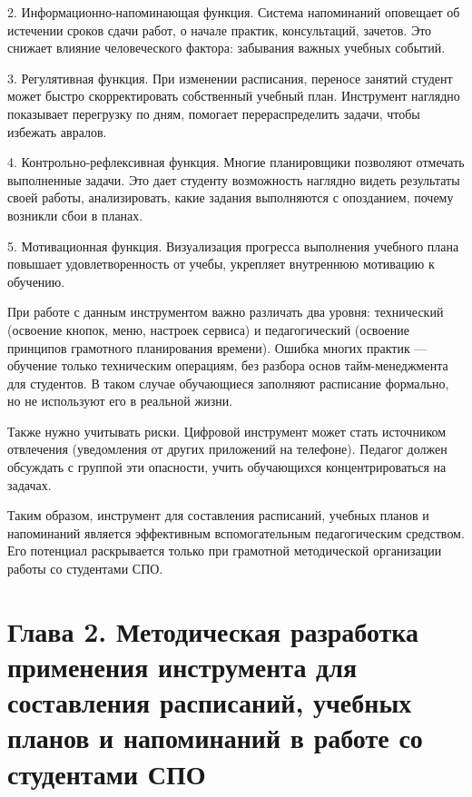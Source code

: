 \documentclass[
]{article}
\begin{document}
2. Информационно-напоминающая функция. Система напоминаний оповещает об
истечении сроков сдачи работ, о начале практик, консультаций, зачетов.
Это снижает влияние человеческого фактора: забывания важных учебных
событий.

3. Регулятивная функция. При изменении расписания, переносе занятий
студент может быстро скорректировать собственный учебный план.
Инструмент наглядно показывает перегрузку по дням, помогает
перераспределить задачи, чтобы избежать авралов.

4. Контрольно-рефлексивная функция. Многие планировщики позволяют
отмечать выполненные задачи. Это дает студенту возможность наглядно
видеть результаты своей работы, анализировать, какие задания выполняются
с опозданием, почему возникли сбои в планах.

5. Мотивационная функция. Визуализация прогресса выполнения учебного
плана повышает удовлетворенность от учебы, укрепляет внутреннюю
мотивацию к обучению.

При работе с данным инструментом важно различать два уровня: технический
(освоение кнопок, меню, настроек сервиса) и педагогический (освоение
принципов грамотного планирования времени). Ошибка многих практик ---
обучение только техническим операциям, без разбора основ
тайм-менеджмента для студентов. В таком случае обучающиеся заполняют
расписание формально, но не используют его в реальной жизни.

Также нужно учитывать риски. Цифровой инструмент может стать источником
отвлечения (уведомления от других приложений на телефоне). Педагог
должен обсуждать с группой эти опасности, учить обучающихся
концентрироваться на задачах.

Таким образом, инструмент для составления расписаний, учебных планов и
напоминаний является эффективным вспомогательным педагогическим
средством. Его потенциал раскрывается только при грамотной методической
организации работы со студентами СПО.

\section{\texorpdfstring{\textbf{Глава 2. Методическая разработка
применения инструмента для составления расписаний, учебных планов и
напоминаний в работе со студентами
СПО}}{Глава 2. Методическая разработка применения инструмента для составления расписаний, учебных планов и напоминаний в работе со студентами СПО}}\label{ux433ux43bux430ux432ux430-2.-ux43cux435ux442ux43eux434ux438ux447ux435ux441ux43aux430ux44f-ux440ux430ux437ux440ux430ux431ux43eux442ux43aux430-ux43fux440ux438ux43cux435ux43dux435ux43dux438ux44f-ux438ux43dux441ux442ux440ux443ux43cux435ux43dux442ux430-ux434ux43bux44f-ux441ux43eux441ux442ux430ux432ux43bux435ux43dux438ux44f-ux440ux430ux441ux43fux438ux441ux430ux43dux438ux439-ux443ux447ux435ux431ux43dux44bux445-ux43fux43bux430ux43dux43eux432-ux438-ux43dux430ux43fux43eux43cux438ux43dux430ux43dux438ux439-ux432-ux440ux430ux431ux43eux442ux435-ux441ux43e-ux441ux442ux443ux434ux435ux43dux442ux430ux43cux438-ux441ux43fux43e}
\end{document}
